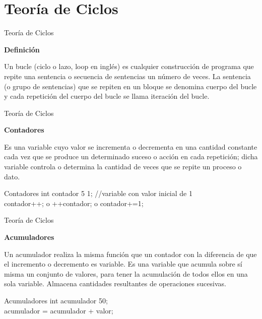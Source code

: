 \section{Teoría de Ciclos}

\begin{frame}{Teoría de Ciclos}
    \begin{center}\textbf{Definición}\end{center}
    \justify
    \hspace{5mm}
    Un bucle (ciclo o lazo, loop en inglés) es cualquier construcción de programa que
    repite una sentencia o secuencia de sentencias un número de veces. La sentencia (o
    grupo de sentencias) que se repiten en un bloque se denomina cuerpo del bucle y
    cada repetición del cuerpo del bucle se llama iteración del bucle.
\end{frame}


\begin{frame}{Teoría de Ciclos}
    \begin{center}\textbf{Contadores}\end{center}
    \vspace{-2mm}
    Es una variable cuyo valor se incrementa o decrementa en una cantidad constante cada vez que se produce un determinado suceso o acción en cada repetición; dicha variable controla o determina la cantidad de veces que se repite un proceso o dato.
    \begin{block}{Contadores}
        int contador 5 1; //variable con valor inicial de 1\\
        contador++; o ++contador; o contador+=1;
    \end{block}
\end{frame}


\begin{frame}{Teoría de Ciclos}
    \vspace{-1mm}
    \begin{center}\textbf{Acumuladores}\end{center}
    \vspace{-3mm}
    Un acumulador realiza la misma función que un contador con la diferencia de que el incremento o decremento es variable. Es una variable que acumula sobre sí misma un conjunto de valores, para tener la acumulación de todos ellos en una sola variable. Almacena cantidades resultantes de operaciones sucesivas.
    \begin{block}{Acumuladores}
        int acumulador 50;\\
        acumulador = acumulador + valor;
    \end{block}
\end{frame}



